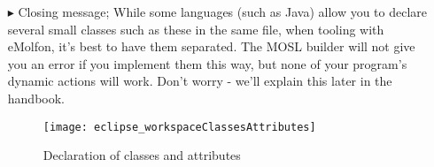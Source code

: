 \begin{itemize}
\vspace{0.5cm}

\item[$\blacktriangleright$] Closing message; While some languages (such as Java) allow you to declare several small classes such as these in the same file,
when tooling with eMolfon, it's best to have them separated. The MOSL builder will not give you an error if you implement them this way, but none of your
program's dynamic actions will work. Don't worry - we'll explain this later in the handbook.

\newpage

\vspace*{3cm}

\begin{figure}[htbp]
	\centering
  \texttt{[image: eclipse\_workspaceClassesAttributes]}
	\caption{Declaration of classes and attributes}
	\label{fig:workspaceClassAttributes}
\end{figure} 


\end{itemize}
